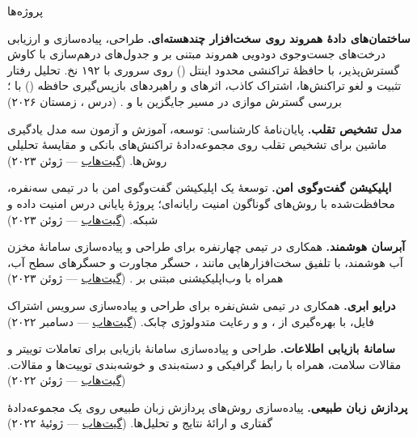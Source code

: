 \documentclass[11pt]{article}
\begin{document}
\begin{faSection}{پروژه‌ها}

\textbf{ساختمان‌های دادۀ همروند روی سخت‌افزار چندهسته‌ای.} طراحی، پیاده‌سازی و ارزیابی درخت‌های جست‌وجوی دودویی همروند مبتنی بر  و جدول‌های درهم‌سازی با کاوش گسترش‌پذیر، با حافظۀ تراکنشی محدود اینتل () روی سروری  با ۱۹۲ نخ. تحلیل رفتار تثبیت و لغو تراکنش‌ها، اشتراک کاذب، اثرهای  و راهبردهای بازپس‌گیری حافظه () با ؛ بررسی گسترش موازی در مسیر جایگزین با  و . (درس ، زمستان ۲۰۲۶)

\vspace{0.4em}
\textbf{مدل تشخیص تقلب.} پایان‌نامۀ کارشناسی: توسعه، آموزش و آزمون سه مدل یادگیری ماشین برای تشخیص تقلب روی مجموعه‌دادۀ تراکنش‌های بانکی و مقایسۀ تحلیلی روش‌ها. (\href{https://github.com/kahbodaeini/Fraud-Detection}{گیت‌هاب} --- ژوئن ۲۰۲۳)

\vspace{0.4em}
\textbf{اپلیکیشن گفت‌وگوی امن.} توسعۀ یک اپلیکیشن گفت‌وگوی امن با  در تیمی سه‌نفره، محافظت‌شده با روش‌های گوناگون امنیت رایانه‌ای؛ پروژۀ پایانی درس امنیت داده و شبکه. (\href{https://github.com/rerfan24/DNS-project}{گیت‌هاب} --- ژوئن ۲۰۲۳)

\vspace{0.4em}
\textbf{آبرسان هوشمند.} همکاری در تیمی چهارنفره برای طراحی و پیاده‌سازی سامانۀ مخزن آب هوشمند، با تلفیق سخت‌افزارهایی مانند ، حسگر مجاورت و حسگرهای سطح آب، همراه با وب‌اپلیکیشنی مبتنی بر . (\href{https://github.com/Parsa2820/es-project}{گیت‌هاب} --- ژوئن ۲۰۲۳)

\vspace{0.4em}
\textbf{درایو ابری.} همکاری در تیمی شش‌نفره برای طراحی و پیاده‌سازی سرویس اشتراک فایل، با بهره‌گیری از ،  و  و رعایت متدولوژی چابک. (\href{https://github.com/sad-project}{گیت‌هاب} --- دسامبر ۲۰۲۲)

\vspace{0.4em}
\textbf{سامانۀ بازیابی اطلاعات.} طراحی و پیاده‌سازی سامانۀ بازیابی برای تعاملات توییتر و مقالات سلامت، همراه با رابط گرافیکی و دسته‌بندی و خوشه‌بندی توییت‌ها و مقالات. (\href{https://github.com/IR1401-Spring-Final-Projects/SocialMediaHealth1401-19_39}{گیت‌هاب} --- ژوئن ۲۰۲۲)

\vspace{0.4em}
\textbf{پردازش زبان طبیعی.} پیاده‌سازی روش‌های پردازش زبان طبیعی روی یک مجموعه‌دادۀ گفتاری و ارائۀ نتایج و تحلیل‌ها. (\href{https://github.com/kahbodaeini/MIR_NLP}{گیت‌هاب} --- ژوئیۀ ۲۰۲۲)


\end{faSection}
\end{document}
